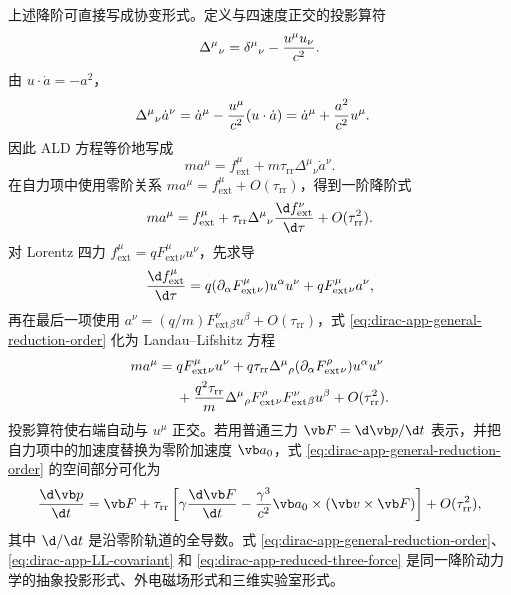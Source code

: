 上述降阶可直接写成协变形式。定义与四速度正交的投影算符
\begin{equation}
 \Delta^\mu{}_{\nu}
 =\delta^\mu{}_{\nu}-{u^\mu u_\nu\over c^2}.
 \label{eq:dirac-app-orthogonal-projector}
\end{equation}
由 $u\cdot\dot a=-a^2$，
\begin{align}
 \Delta^\mu{}_{\nu}\dot a^\nu
 &=\dot a^\mu-{u^\mu\over c^2}(u\cdot\dot a)
 =\dot a^\mu+{a^2\over c^2}u^\mu.
 \label{eq:dirac-app-projector-ald}
\end{align}
因此 ALD 方程等价地写成
\begin{equation}
 ma^\mu=f_{\mathrm{ext}}^\mu
 +m\tau_{\mathrm{rr}}\Delta^\mu{}_{\nu}\dot a^\nu.
 \label{eq:dirac-app-ald-projector-form}
\end{equation}
在自力项中使用零阶关系 $ma^\mu=f_{\mathrm{ext}}^\mu+O(\tau_{\mathrm{rr}})$，得到一阶降阶式
\begin{equation}
 ma^\mu=f_{\mathrm{ext}}^\mu
 +\tau_{\mathrm{rr}}\Delta^\mu{}_{\nu}
 {\d f_{\mathrm{ext}}^\nu\over\d\tau}
 +O(\tau_{\mathrm{rr}}^2).
 \label{eq:dirac-app-general-reduction-order}
\end{equation}
对 Lorentz 四力 $f_{\mathrm{ext}}^\mu=qF_{\mathrm{ext}}^\mu{}_{\nu}u^\nu$，先求导
\begin{equation*}
 {\d f_{\mathrm{ext}}^\mu\over\d\tau}
 =q(\partial_\alpha F_{\mathrm{ext}}^\mu{}_{\nu})u^\alpha u^\nu
 +qF_{\mathrm{ext}}^\mu{}_{\nu}a^\nu,
\end{equation*}
再在最后一项使用 $a^\nu=(q/m)F_{\mathrm{ext}}^\nu{}_{\beta}u^\beta+O(\tau_{\mathrm{rr}})$，式 \eqref{eq:dirac-app-general-reduction-order} 化为 Landau--Lifshitz 方程
\begin{align}
 ma^\mu={}&qF_{\mathrm{ext}}^\mu{}_{\nu}u^\nu
 +q\tau_{\mathrm{rr}}
 \Delta^\mu{}_{\rho}
 (\partial_\alpha F_{\mathrm{ext}}^\rho{}_{\nu})u^\alpha u^\nu
 \notag\\
 &+{q^2\tau_{\mathrm{rr}}\over m}
 \Delta^\mu{}_{\rho}
 F_{\mathrm{ext}}^\rho{}_{\nu}
 F_{\mathrm{ext}}^\nu{}_{\beta}u^\beta
 +O(\tau_{\mathrm{rr}}^2).
 \label{eq:dirac-app-LL-covariant}
\end{align}
投影算符使右端自动与 $u^\mu$ 正交。若用普通三力 $\vb F=\d\vb p/\d t$ 表示，并把自力项中的加速度替换为零阶加速度 $\vb a_0$，式 \eqref{eq:dirac-app-general-reduction-order} 的空间部分可化为
\begin{equation}
 {\d\vb p\over\d t}
 =\vb F
 +\tau_{\mathrm{rr}}
 \left[
 \gamma{\d\vb F\over\d t}
 -{\gamma^3\over c^2}
 \vb a_0\times(\vb v\times\vb F)
 \right]
 +O(\tau_{\mathrm{rr}}^2),
 \label{eq:dirac-app-reduced-three-force}
\end{equation}
其中 $\d/\d t$ 是沿零阶轨道的全导数。式 \eqref{eq:dirac-app-general-reduction-order}、\eqref{eq:dirac-app-LL-covariant} 和 \eqref{eq:dirac-app-reduced-three-force} 是同一降阶动力学的抽象投影形式、外电磁场形式和三维实验室形式。

